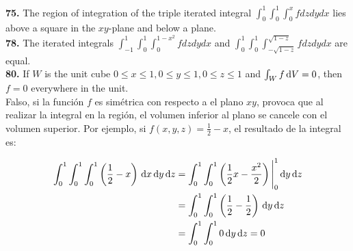 \documentclass[11pt]{report}
\begin{document}
\textbf{75.} The region of integration of the triple iterated integral
$\int_0^1 \int_0^1 \int_0^x f dz dy dx $ lies above a square in the $xy$-plane
and below a plane. \\

\textbf{78.} The iterated integrals $\int_{-1}^1 \int_0^1 \int_0^{1-x^2} f dz dy dx $
and $\int_0^1 \int_0^1 \int_{-\sqrt{1-z}}^{\sqrt{1-z}} f dz dy dx $ are equal. \\

\textbf{80.} If $W$ is the unit cube $0 \leq x \leq 1, 0 \leq y \leq 1, 0 \leq z \leq 1$
and $ \int _W f \, \text dV = 0$, then $f = 0$ everywhere in the unit. \\

Falso, si la función $f$ es simétrica con respecto a el plano $xy$, provoca que al
realizar la integral en la región, el volumen inferior al plano se cancele con el
volumen superior. Por ejemplo, si $f(x,y,z) = \frac{1}{2} - x$, el resultado
de la integral es:

\begin{equation}
\begin{split}
        \int_0^1 \int_0^1 \int_0^1 \left( \frac{1}{2} - x \right) \, \text dx \, \text dy \, \text dz
        &= \int_0^1 \int_0^1 \left( \frac{1}{2}x - \frac{x^2}{2} \right) \Bigg|_0^1 \, \text dy \, \text dz \\ \notag
        &= \int_0^1 \int_0^1 \left( \frac{1}{2} - \frac{1}{2} \right) \, \text dy \, \text dz \\ \notag
        &= \int_0^1 \int_0^1 0 \, \text dy \, \text dz = 0 \\ \notag
\end{split}
\end{equation}
\end{document}
